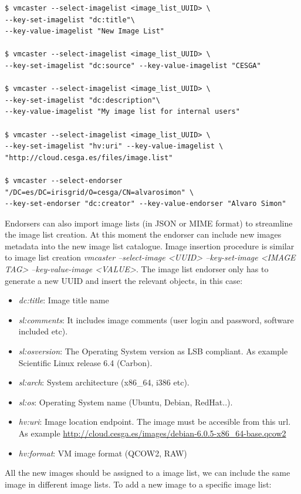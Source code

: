 \documentclass{llncs_Ibergrid2013}
\begin{document}
\begin{verbatim}
$ vmcaster --select-imagelist <image_list_UUID> \
--key-set-imagelist "dc:title"\ 
--key-value-imagelist "New Image List"

$ vmcaster --select-imagelist <image_list_UUID> \ 
--key-set-imagelist "dc:source" --key-value-imagelist "CESGA"

$ vmcaster --select-imagelist <image_list_UUID> \ 
--key-set-imagelist "dc:description"\ 
--key-value-imagelist "My image list for internal users"

$ vmcaster --select-imagelist <image_list_UUID> \ 
--key-set-imagelist "hv:uri" --key-value-imagelist \ 
"http://cloud.cesga.es/files/image.list"

$ vmcaster --select-endorser "/DC=es/DC=irisgrid/O=cesga/CN=alvarosimon" \
--key-set-endorser "dc:creator" --key-value-endorser "Alvaro Simon"
\end{verbatim}

Endorsers can also import image lists (in JSON or MIME format) to streamline the image list creation. At this moment the endorser can include new images metadata into the new image list catalogue.
Image insertion procedure is similar to image list creation \textit{vmcaster --select-image <UUID> --key-set-image <IMAGE TAG> --key-value-image <VALUE>}.  
The image list endorser only has to generate a new UUID and insert the relevant objects, in this case:
\begin{itemize}
 \item \textit{dc:title}: Image title name
 \item \textit{sl:comments}: It includes image comments (user login and password, software included etc).
 \item \textit{sl:osversion}: The Operating System version as LSB compliant. As example Scientific Linux release 6.4 (Carbon).
 \item \textit{sl:arch}: System architecture (x86\_64, i386 etc).
 \item \textit{sl:os}: Operating System name (Ubuntu, Debian, RedHat..).
 \item \textit{hv:uri}: Image location endpoint. The image must be accesible from this url. As example \url{http://cloud.cesga.es/images/debian-6.0.5-x86_64-base.qcow2}
 \item \textit{hv:format}: VM image format (QCOW2, RAW)
\end{itemize}
All the new images should be assigned to a image list, we can include the same image in different image lists. To add a new image to a specific image list:
\end{document}
